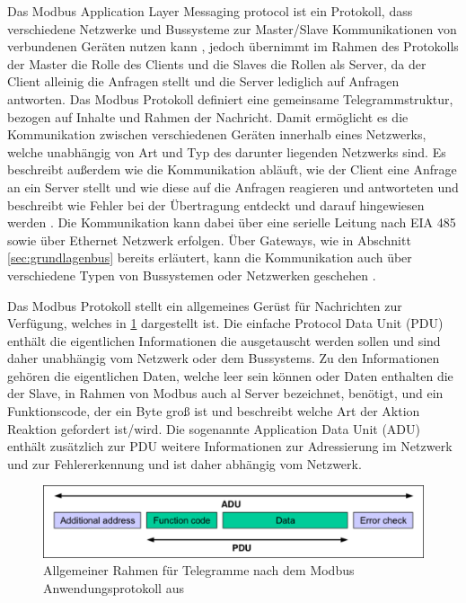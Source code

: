 Das Modbus Application Layer Messaging protocol ist ein Protokoll, dass verschiedene Netzwerke und Bussysteme zur Master/Slave Kommunikationen von verbundenen Geräten nutzen kann \cite[S.~2f.]{mod12}, jedoch übernimmt im Rahmen des Protokolls der Master die Rolle des Clients und die Slaves die Rollen als Server, da der Client alleinig die Anfragen stellt und die Server lediglich auf Anfragen antworten.
Das Modbus Protokoll definiert eine gemeinsame Telegrammstruktur, bezogen auf Inhalte und Rahmen der Nachricht. Damit ermöglicht es die Kommunikation zwischen verschiedenen Geräten innerhalb eines Netzwerks, welche unabhängig von Art und Typ des darunter liegenden Netzwerks sind. Es beschreibt außerdem wie die Kommunikation abläuft, wie der Client eine Anfrage an ein Server stellt und wie diese auf die Anfragen reagieren und antworteten und beschreibt wie Fehler bei der Übertragung entdeckt und darauf hingewiesen werden \cite[S.~2f.]{mod96}.
Die Kommunikation kann dabei über eine serielle Leitung nach EIA 485 sowie über Ethernet Netzwerk erfolgen. Über Gateways, wie in Abschnitt \ref{sec:grundlagenbus} bereits erläutert, kann die Kommunikation auch über verschiedene Typen von Bussystemen oder Netzwerken geschehen \cite[S.~3f.]{mod12}.


Das Modbus Protokoll stellt ein allgemeines Gerüst für Nachrichten zur Verfügung, welches in \ref{fig:modbusframe} dargestellt ist.  Die einfache Protocol Data Unit (PDU) enthält die eigentlichen Informationen die ausgetauscht werden sollen und sind daher unabhängig vom Netzwerk oder dem Bussystems. Zu den Informationen gehören die eigentlichen Daten, welche leer sein können oder Daten enthalten die der Slave, in Rahmen von Modbus auch al Server bezeichnet, benötigt, und ein Funktionscode, der ein Byte groß ist und beschreibt welche Art der Aktion Reaktion gefordert ist/wird. Die sogenannte Application Data Unit (ADU) enthält zusätzlich zur PDU weitere Informationen zur Adressierung im Netzwerk und zur Fehlererkennung und ist daher abhängig vom Netzwerk. 

\begin{figure}
\centering
\includegraphics[width=\textwidth]{abbildungen/20160319_Modbusframe}
\caption[Allgemeiner Rahmen für Telegramme nach dem Modbus Anwendungsprotokoll]{Allgemeiner Rahmen für Telegramme nach dem Modbus Anwendungsprotokoll aus \cite[S.~3]{mod12}}
\label{fig:modbusframe}
\end{figure}

